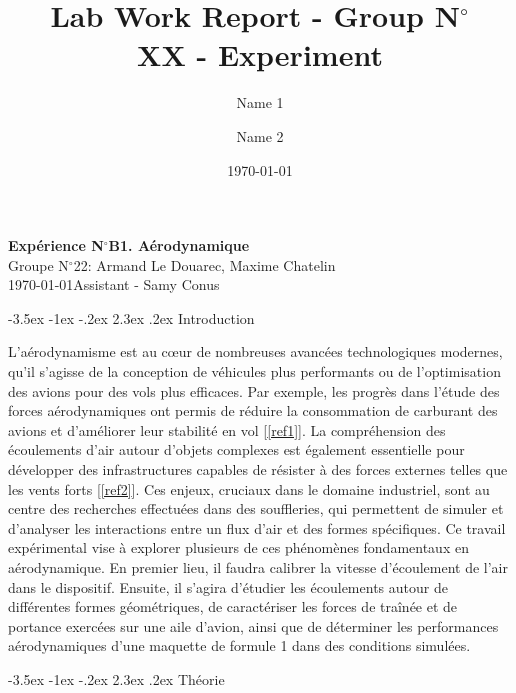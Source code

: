 \documentclass[a4paper, 12pt,oneside]{article}
\makeatletter
\renewcommand{\section}{\@startsection {section}{1}{\z@}%
             {-3.5ex \@plus -1ex \@minus -.2ex}%
             {2.3ex \@plus.2ex}%
             {\normalfont\normalsize\bfseries}}
\makeatother
\begin{document}
\title{\normalsize{Lab Work Report - Group N$^\circ$\\ XX - Experiment}}
\date{\normalsize{\today}}
\author{\normalsize{Name} 1\and \normalsize{Name 2}}

\begin{center}
\large\textbf{\sffamily Expérience N$^\circ$B1. Aérodynamique}\\%
\large\sffamily Groupe N$^\circ$22: Armand Le Douarec, Maxime Chatelin\\%
\large\sffamily\today\quad   Assistant -  Samy Conus \\%
\end{center}

\vspace{-0.35cm}
\section{Introduction}
\vspace{-0.3cm}

L’aérodynamisme est au cœur de nombreuses avancées technologiques modernes, qu’il s’agisse de la conception de véhicules plus performants ou de l’optimisation des avions pour des vols plus efficaces. Par exemple, les progrès dans l’étude des forces aérodynamiques ont permis de réduire la consommation de carburant des avions et d’améliorer leur stabilité en vol [\ref{ref1}]. La compréhension des écoulements d’air autour d’objets complexes est également essentielle pour développer des infrastructures capables de résister à des forces externes telles que les vents forts [\ref{ref2}]. Ces enjeux, cruciaux dans le domaine industriel, sont au centre des recherches effectuées dans des souffleries, qui permettent de simuler et d’analyser les interactions entre un flux d’air et des formes spécifiques. Ce travail expérimental vise à explorer plusieurs de ces phénomènes fondamentaux en aérodynamique. En premier lieu, il faudra calibrer la vitesse d'écoulement de l'air dans le dispositif. Ensuite, il s’agira d’étudier les écoulements autour de différentes formes géométriques, de caractériser les forces de traînée et de portance exercées sur une aile d’avion, ainsi que de déterminer les performances aérodynamiques d’une maquette de formule 1 dans des conditions simulées.

\vspace{-0.35cm}
\section{Théorie}
\vspace{-0.3cm}
\end{document}
